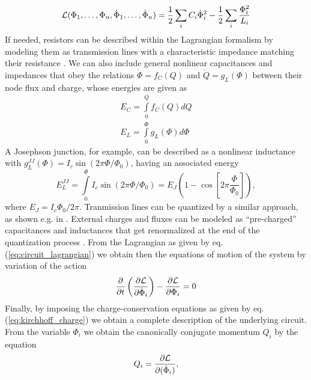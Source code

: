 %
\begin{equation}
\begin{mathcal}L\end{mathcal}(\Phi_1,\hdots,\Phi_n,\dot{\Phi}_1,\hdots,\dot{\Phi}_n) = \frac{1}{2}\sum\limits_i C_i \dot{\Phi}_i^2-\frac{1}{2}\sum\limits_i \frac{\Phi_i^2}{L_i} \label{eq:circuit_lagrangian}
\end{equation}
%
If needed, resistors can be described within the Lagrangian formalism by modeling them as transmission lines with a characteristic impedance matching their resistance \citep{yurke_quantum_1984}. We can also include general nonlinear capacitances and impedances that obey the relations $\dot{\Phi}=f_C(Q)$ and $\dot{Q}=g_L(\Phi)$ between their node flux and charge, whose energies are given as
%
\begin{eqnarray}
E_C = \int\limits_0^Q f_C(Q)dQ \\
E_L = \int\limits_0^\Phi g_L(\Phi)d\Phi
\end{eqnarray}
%
A Josephson junction, for example, can be described as a nonlinear inductance with $g_L^{JJ}(\Phi)=I_c\sin{(2\pi\Phi/\Phi_0)}$, having an associated energy
%
\begin{equation}
E_L^{JJ} = \int\limits_0^\Phi I_c\sin{\left(2\pi\Phi/\Phi_0\right)}=E_J(1-\cos{\left[2\pi\frac{\Phi}{\Phi_0}\right]}),
\end{equation}
%
where $E_J = I_c\Phi_0/2\pi$. Tranmission lines can be quantized by a similar approach, as shown e.g. in \citep{yurke_quantum_1984}. External charges and fluxes can be modeled as ``pre-charged'' capacitances and inductances that get renormalized at the end of the quantization process \citep{devoret_quantum_1995}. From the Lagrangian as given by eq. (\ref{eq:circuit_lagrangian}) we obtain then the equations of motion of the system by variation of the action
%
\begin{equation}
\frac{\partial}{\partial t}\left( \frac{\partial \begin{mathcal}L\end{mathcal}}{\partial\dot{\Phi}_i}\right)-\frac{\partial \begin{mathcal}L\end{mathcal}}{\partial \Phi_i} = 0
\end{equation}
%
Finally, by imposing the charge-conservation equations as given by eq. (\ref{eq:kirchhoff_charge}) we obtain a complete description of the underlying circuit. From the variable $\Phi_i$ we obtain the canonically conjugate momentum $Q_i$ by the equation
%
\begin{equation}
Q_i = \frac{\partial \begin{mathcal}L\end{mathcal}}{\partial(\dot{\Phi}_i)}, \label{eq:canonical_momentum}
\end{equation}

